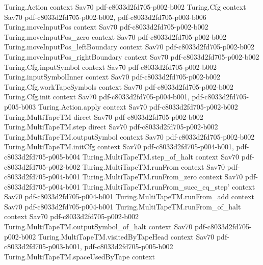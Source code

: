 \begin{theorem}
\label{Complexity.spaceConstructible_poly}
\leanok
\proofstep
  {Turing.Action}
  {context}
  {Sav70}
  {pdf-c8033d2fd705-p002-b002}
\proofstep
  {Turing.Cfg}
  {context}
  {Sav70}
  {pdf-c8033d2fd705-p002-b002,
    pdf-c8033d2fd705-p003-b006}
\proofstep
  {Turing.moveInputPos}
  {context}
  {Sav70}
  {pdf-c8033d2fd705-p002-b002}
\proofstep
  {Turing.moveInputPos_zero}
  {context}
  {Sav70}
  {pdf-c8033d2fd705-p002-b002}
\proofstep
  {Turing.moveInputPos_leftBoundary}
  {context}
  {Sav70}
  {pdf-c8033d2fd705-p002-b002}
\proofstep
  {Turing.moveInputPos_rightBoundary}
  {context}
  {Sav70}
  {pdf-c8033d2fd705-p002-b002}
\proofstep
  {Turing.Cfg.inputSymbol}
  {context}
  {Sav70}
  {pdf-c8033d2fd705-p002-b002}
\proofstep
  {Turing.inputSymbolInner}
  {context}
  {Sav70}
  {pdf-c8033d2fd705-p002-b002}
\proofstep
  {Turing.Cfg.workTapeSymbols}
  {context}
  {Sav70}
  {pdf-c8033d2fd705-p002-b002}
\proofstep
  {Turing.Cfg.init}
  {context}
  {Sav70}
  {pdf-c8033d2fd705-p004-b001,
    pdf-c8033d2fd705-p005-b003}
\proofstep
  {Turing.Action.apply}
  {context}
  {Sav70}
  {pdf-c8033d2fd705-p002-b002}
\proofstep
  {Turing.MultiTapeTM}
  {direct}
  {Sav70}
  {pdf-c8033d2fd705-p002-b002}
\proofstep
  {Turing.MultiTapeTM.step}
  {direct}
  {Sav70}
  {pdf-c8033d2fd705-p002-b002}
\proofstep
  {Turing.MultiTapeTM.outputSymbol}
  {context}
  {Sav70}
  {pdf-c8033d2fd705-p002-b002}
\proofstep
  {Turing.MultiTapeTM.initCfg}
  {context}
  {Sav70}
  {pdf-c8033d2fd705-p004-b001,
    pdf-c8033d2fd705-p005-b004}
\proofstep
  {Turing.MultiTapeTM.step_of_halt}
  {context}
  {Sav70}
  {pdf-c8033d2fd705-p002-b002}
\proofstep
  {Turing.MultiTapeTM.runFrom}
  {context}
  {Sav70}
  {pdf-c8033d2fd705-p004-b001}
\proofstep
  {Turing.MultiTapeTM.runFrom_zero}
  {context}
  {Sav70}
  {pdf-c8033d2fd705-p004-b001}
\proofstep
  {Turing.MultiTapeTM.runFrom_succ_eq_step'}
  {context}
  {Sav70}
  {pdf-c8033d2fd705-p004-b001}
\proofstep
  {Turing.MultiTapeTM.runFrom_add}
  {context}
  {Sav70}
  {pdf-c8033d2fd705-p004-b001}
\proofstep
  {Turing.MultiTapeTM.runFrom_of_halt}
  {context}
  {Sav70}
  {pdf-c8033d2fd705-p002-b002}
\proofstep
  {Turing.MultiTapeTM.outputSymbol_of_halt}
  {context}
  {Sav70}
  {pdf-c8033d2fd705-p002-b002}
\proofstep
  {Turing.MultiTapeTM.visitedByTapeHead}
  {context}
  {Sav70}
  {pdf-c8033d2fd705-p003-b001,
    pdf-c8033d2fd705-p005-b002}
\proofstep
  {Turing.MultiTapeTM.spaceUsedByTape}
  {context}

\end{theorem}
